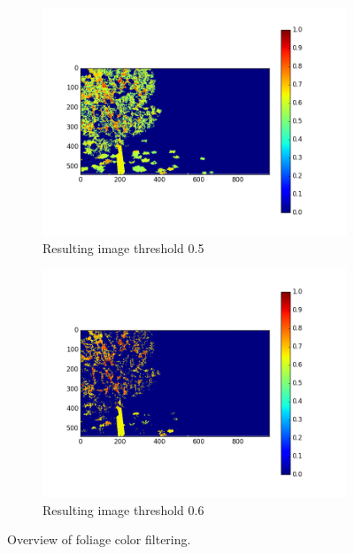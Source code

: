 \documentclass[fleqn,10pt]{SelfArx} %
\begin{document}
\begin{figure}
        \begin{subfigure}[b]{0.5\textwidth}
                \includegraphics[width=\linewidth]{Figures/ColorFigures/res3_05.png}
                \caption{Resulting image threshold 0.5}
                \label{fig:Thresh05ColIm}
        \end{subfigure}
        \begin{subfigure}[b]{0.5\textwidth}
                \includegraphics[width=\linewidth]{Figures/ColorFigures/res3_06.png}
                \caption{Resulting image threshold 0.6}
                \label{fig:Thresh05ColIm}
        \end{subfigure}
        \caption{Overview of foliage color filtering.}\label{fig:ColFilters}
\end{figure}
\end{document}
